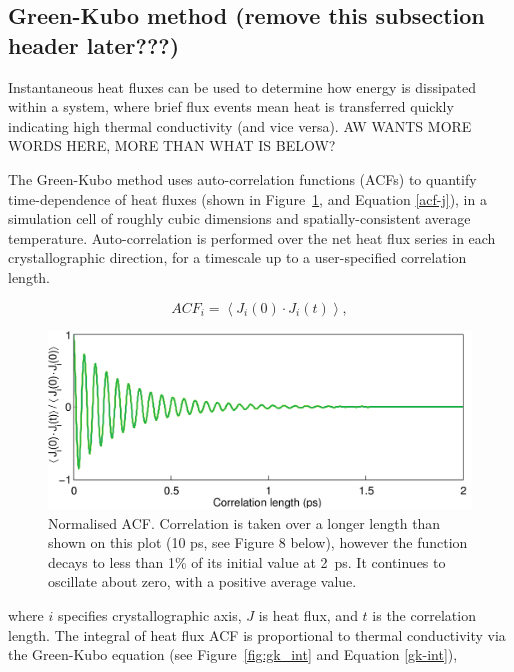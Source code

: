 \documentclass[%
preprint,                                  %
nofootinbib,
 amsmath,amssymb,
 aps,
]{revtex4-1}
\begin{document}
\subsection{\label{sec:intro.gk}Green-Kubo method (remove this subsection header later???)}

Instantaneous heat fluxes can be used to determine how energy is dissipated within a system, where brief flux events mean heat is transferred quickly indicating high thermal conductivity (and vice versa). AW WANTS MORE WORDS HERE, MORE THAN WHAT IS BELOW?

The Green-Kubo method uses auto-correlation functions (ACFs) to quantify time-dependence of heat fluxes (shown in Figure~\ref{fig:gk_acf}, and Equation \ref{acf-j}), in a simulation cell of roughly cubic dimensions and spatially-consistent average temperature. Auto-correlation is performed over the net heat flux series in each crystallographic direction, for a timescale up to a user-specified correlation length.

\begin{equation}
ACF_i = \left \langle J_i(0) \cdot  J_i(t) \right \rangle,
\label{acf-j}
\end{equation}
\begin{figure}[h]
  \includegraphics[width=\linewidth]{images/gk_acf.png}
  \caption{Normalised ACF. Correlation is taken over a longer length than shown on this plot (10 ps, see Figure 8 below), however the function decays to less than 1\% of its initial value at 2~ps. It continues to oscillate about zero, with a positive average value.}
  \label{fig:gk_acf}
\end{figure}
where $i$ specifies crystallographic axis, $J$ is heat flux, and $t$ is the correlation length. The integral of heat flux ACF is proportional to thermal conductivity via the Green-Kubo equation (see Figure~\ref{fig:gk_int} and Equation \ref{gk-int}), 
\end{document}
